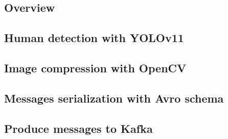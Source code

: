\subsection{Overview}

\subsection{Human detection with YOLOv11}

\subsection{Image compression with OpenCV}

\subsection{Messages serialization with Avro schema}

\subsection{Produce messages to Kafka}